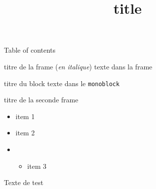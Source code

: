 \documentclass{beamer}
\begin{document}
\title{ {{title}} }




\frame{\titlepage}
\begin{frame}{Table of contents}
    \tableofcontents
\end{frame}\begin{frame}{titre de la frame (\textit{en italique})}
    texte dans la frame
\begin{block}{ titre du block }
    texte dans le \texttt{monoblock}
\end{block}
\end{frame}
\begin{frame}{titre de la seconde frame}
    \begin{itemize}
    
    \item item 1
    
    \item item 2
    
    \item \begin{itemize}
    
    \item item 3
    
\end{itemize}
    
\end{itemize}
\end{frame}
Texte de test
\end{document}
